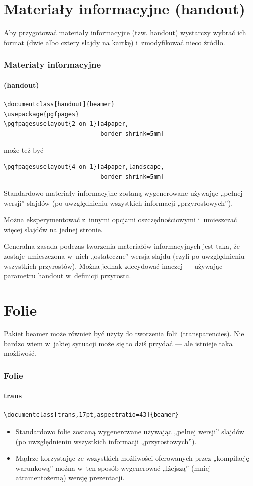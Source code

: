 \documentclass[12pt,aspectratio=169,ignorenonframetext]{beamer}
\begin{document}
\section{Materiały informacyjne (handout)}

Aby przygotować materiały informacyjne (tzw. handout) wystarczy wybrać ich format (dwie albo cztery slajdy na kartkę) i~zmodyfikować nieco źródło.
\begin{frame}[fragile]
 \frametitle<presentation>{Materiały informacyjne}
 \framesubtitle<presentation>{(handout)}
 \hypertarget{sec:handout}{}
 \begin{lstlisting}
\documentclass[handout]{beamer}
\usepackage{pgfpages}
\pgfpagesuselayout{2 on 1}[a4paper,
                           border shrink=5mm]
\end{lstlisting}
 może też być
 \begin{lstlisting}
\pgfpagesuselayout{4 on 1}[a4paper,landscape,
                           border shrink=5mm]
\end{lstlisting}
 Standardowo materiały informacyjne zostaną wygenerowane używając „pełnej wersji” slajdów (po uwzględnieniu wszystkich informacji „przyrostowych”).
\end{frame}
Można eksperymentować z~innymi opcjami oszczędnościowymi i~umieszczać więcej slajdów na jednej stronie.

Generalna zasada podczas tworzenia materiałów informacyjnych jest taka, że zostaje umieszczona w~nich „ostateczne” wersja slajdu (czyli po uwzględnieniu wszystkich przyrostów). Można jednak zdecydować inaczej — używając parametru handout w~definicji przyrostu.

\section{Folie}

Pakiet beamer może również być użyty do tworzenia folii (transparencies). Nie bardzo wiem w~jakiej sytuacji może się to dziś przydać — ale istnieje taka możliwość.

\begin{frame}[fragile]
 \frametitle<presentation>{Folie}
 \framesubtitle{trans}
 \hypertarget{sec:trans}{}
 \begin{lstlisting}
\documentclass[trans,17pt,aspectratio=43]{beamer}
\end{lstlisting}
 \begin{itemize}
  \item
        Standardowo folie zostaną wygenerowane używając „pełnej wersji” slajdów (po uwzględnieniu wszystkich informacji „przyrostowych”).
  \item
        Mądrze korzystając ze wszystkich możliwości oferowanych przez „kompilację warunkową”  można w~ten sposób wygenerować „lżejszą” (mniej atramentożerną) wersję prezentacji.
 \end{itemize}

\end{frame}
\end{document}
